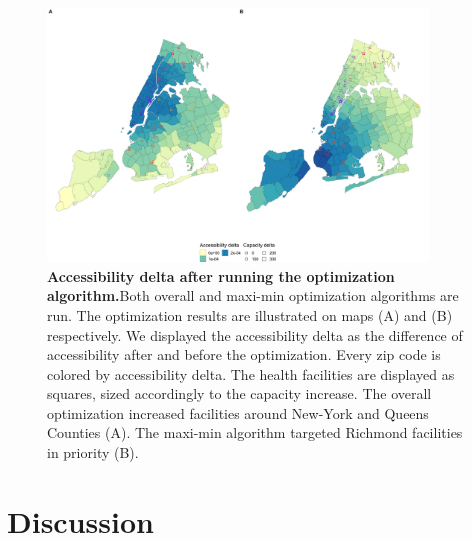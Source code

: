 \begin{figure}[H]
    \includegraphics[width=0.9\textwidth]{images/camion-ny/fig3.png}
    \centering
    \caption{ \textbf{Accessibility delta after running the optimization
            algorithm.}Both overall and maxi-min optimization algorithms are run.
        The optimization results are illustrated on maps (A) and (B)
        respectively. We displayed the accessibility delta as the difference of
        accessibility after and before the optimization. Every zip code is
        colored by accessibility delta. The health facilities are displayed as
        squares, sized accordingly to the capacity increase. The overall
        optimization increased facilities around New-York and Queens Counties
        (A). The maxi-min algorithm targeted Richmond facilities in priority
        (B). }
    \label{fig:camion-ny-optim}
\end{figure}

\section{Discussion}

